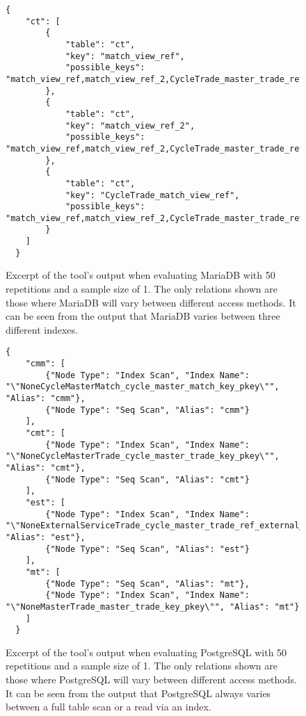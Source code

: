 \begin{figure}[ht]
  \begin{verbatim}
{
    "ct": [
        {
            "table": "ct",
            "key": "match_view_ref",
            "possible_keys": "match_view_ref,match_view_ref_2,CycleTrade_master_trade_ref,CycleTrade_trade_ref,CycleTrade_match_view_ref"
        },
        {
            "table": "ct",
            "key": "match_view_ref_2",
            "possible_keys": "match_view_ref,match_view_ref_2,CycleTrade_master_trade_ref,CycleTrade_trade_ref,CycleTrade_match_view_ref"
        },
        {
            "table": "ct",
            "key": "CycleTrade_match_view_ref",
            "possible_keys": "match_view_ref,match_view_ref_2,CycleTrade_master_trade_ref,CycleTrade_trade_ref,CycleTrade_match_view_ref"
        }
    ]
  }
\end{verbatim}
  \caption[Excerpt of the output for MariaDB with 50 repetitions and a
  sample size of 1.]{Excerpt of the tool's output when evaluating MariaDB with
    50 repetitions and a sample size of 1. The only relations shown are those
    where MariaDB will vary between different access methods. It can be seen
    from the output that MariaDB varies between three different indexes.}\label{fig:json:eval1:test1:mariadb}
\end{figure}

\begin{figure}[ht]
  \begin{verbatim}
{
    "cmm": [
        {"Node Type": "Index Scan", "Index Name": "\"NoneCycleMasterMatch_cycle_master_match_key_pkey\"", "Alias": "cmm"},
        {"Node Type": "Seq Scan", "Alias": "cmm"}
    ],
    "cmt": [
        {"Node Type": "Index Scan", "Index Name": "\"NoneCycleMasterTrade_cycle_master_trade_key_pkey\"", "Alias": "cmt"},
        {"Node Type": "Seq Scan", "Alias": "cmt"}
    ],
    "est": [
        {"Node Type": "Index Scan", "Index Name": "\"NoneExternalServiceTrade_cycle_master_trade_ref_external_servic\"", "Alias": "est"},
        {"Node Type": "Seq Scan", "Alias": "est"}
    ],
    "mt": [
        {"Node Type": "Seq Scan", "Alias": "mt"},
        {"Node Type": "Index Scan", "Index Name": "\"NoneMasterTrade_master_trade_key_pkey\"", "Alias": "mt"}
    ]
  }
\end{verbatim}
  \caption[Excerpt of the tool's output for PostgreSQL with 50 repetitions and a
  sample size of 1.]{Excerpt of the tool's output when evaluating PostgreSQL
    with 50 repetitions and a sample size of 1. The only relations shown are
    those where PostgreSQL will vary between different access methods. It can be
    seen from the output that PostgreSQL always varies between a full table scan or a read
    via an index.}\label{fig:json:eval1:test1:postgresql}
\end{figure}

